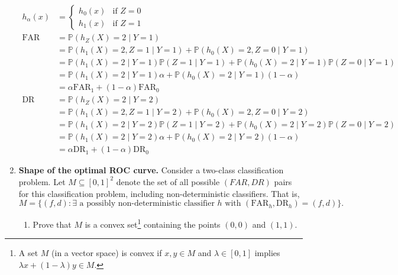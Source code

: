 \documentclass[11pt]{report}
\renewcommand{\P}{\mathbb{P}}
\begin{document}
\begin{enumerate}[1.]
	      \color{blue}
	      \begin{align*}
		      h_{\alpha}(x) & = \begin{cases}
			                        h_0(x) & \text{if } Z = 0 \\
			                        h_1(x) & \text{if } Z = 1
		                        \end{cases}                                                                                   \\
		      \text{FAR}    & = \P(h_{Z}(X) = 2 \; | \; Y = 1)                                                                              \\
		                    & = \P(h_1(X) = 2, Z = 1 \; | \; Y = 1) + \P(h_0(X) = 2, Z = 0 \; | \; Y = 1)                                   \\
		                    & = \P(h_1(X) = 2 \; | \; Y = 1) \P(Z = 1 \; | \; Y = 1) + \P(h_0(X) = 2 \; | \; Y = 1) \P(Z = 0 \; | \; Y = 1) \\
		                    & = \P(h_1(X) = 2 \; | \; Y = 1) \alpha + \P(h_0(X) = 2 \; | \; Y = 1) (1 - \alpha)                             \\
		                    & = \boxed{\alpha \text{FAR}_1 + (1 - \alpha) \text{FAR}_0}                                                     \\
		      \text{DR}     & = \P(h_{Z}(X) = 2 \; | \; Y = 2)                                                                              \\
		                    & = \P(h_1(X) = 2, Z = 1 \; | \; Y = 2) + \P(h_0(X) = 2, Z = 0 \; | \; Y = 2)                                   \\
		                    & = \P(h_1(X) = 2 \; | \; Y = 2) \P(Z = 1 \; | \; Y = 2) + \P(h_0(X) = 2 \; | \; Y = 2) \P(Z = 0 \; | \; Y = 2) \\
		                    & = \P(h_1(X) = 2 \; | \; Y = 2) \alpha + \P(h_0(X) = 2 \; | \; Y = 2) (1 - \alpha)                             \\
		                    & = \boxed{\alpha \text{DR}_1 + (1 - \alpha) \text{DR}_0}
	      \end{align*}
	      \color{black}



	      \pagebreak



	\item {\bf Shape of the optimal ROC curve.} Consider a two-class classification problem. Let $M\subseteq[0,1]^2$ denote the set of all possible $(FAR,DR)$ pairs for this classification problem, including non-deterministic classifiers. That is,
	      \[ M = \{(f,d) : \exists \text{ a possibly non-deterministic classifier $h$ with $(\text{FAR}_h,\text{DR}_h)=(f,d)$} \}  . \]
	      \begin{enumerate}
		      \item Prove that $M$ is a convex set\footnote{A set $M$ (in a vector space) is convex if $x,y\in M$ and $\lambda\in[0,1]$ implies $\lambda x + (1-\lambda) y\in M$.} containing the points $(0,0)$ and $(1,1)$.


\end{enumerate}
\end{enumerate}
\end{document}
